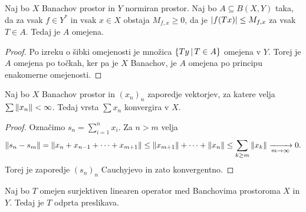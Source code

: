 \begin{posledica}
  Naj bo $X$ Banachov prostor in $Y$ normiran prostor.
  Naj bo $A \subseteq B(X,Y)$ taka, da za vsak $f \in Y^*$ in vsak $x \in X$
  obstaja $M_{f,x} \ge 0$, da je $\left| f(Tx) \right| \le M_{f,x}$ za vsak $T \in A$.
  Tedaj je $A$ omejena.
\end{posledica}

\begin{proof}
  Po izreku o šibki omejenosti je množica $\{Ty \,|\, T \in A\}$ omejena v $Y$.
  Torej je $A$ omejena po točkah, ker pa je $X$ Banachov, je $A$ omejena po
  principu enakomerne omejenosti.
\end{proof}

\begin{lema}
  Naj bo $X$ Banachov prostor in $(x_n)_n$ zaporedje vektorjev, za katere velja
  $\sum \left\lVert x_n\right\rVert < \infty$.
  Tedaj vrsta $\sum x_n$ konvergira v $X$.
\end{lema}

\begin{proof}
  Označimo $s_n = \sum_{i=1}^n x_i$.
  Za $n > m$ velja
  \[
	\left\lVert s_n - s_m\right\rVert = \left\lVert x_n + x_{n-1} + \cdots + x_{m+1}\right\rVert
	\le \left\lVert x_{m+1}\right\rVert + \cdots + \left\lVert x_n\right\rVert
	\le \sum_{k \ge m} \left\lVert x_k\right\rVert
	\xrightarrow[m \to \infty]{} 0.
  \]
  Torej je zaporedje $(s_n)_n$ Cauchyjevo in zato konvergentno.
\end{proof}

\begin{izrek}
  Naj bo $T$ omejen surjektiven linearen operator med Banchovima prostoroma $X$
  in $Y$.
  Tedaj je $T$ odprta preslikava.
\end{izrek}

